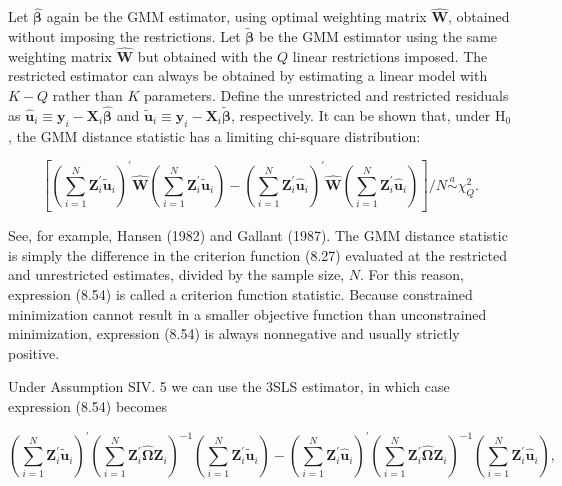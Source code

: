 \documentclass[10pt]{article}
\begin{document}
Let $\hat{\boldsymbol{\beta}}$ again be the GMM estimator, using optimal weighting matrix $\hat{\mathbf{W}}$, obtained without imposing the restrictions. Let $\tilde{\boldsymbol{\beta}}$ be the GMM estimator using the same weighting matrix $\hat{\mathbf{W}}$ but obtained with the $Q$ linear restrictions imposed. The restricted estimator can always be obtained by estimating a linear model with $K-Q$ rather than $K$ parameters. Define the unrestricted and restricted residuals as $\hat{\mathbf{u}}_{i} \equiv \mathbf{y}_{i}-\mathbf{X}_{i} \hat{\boldsymbol{\beta}}$ and $\tilde{\mathbf{u}}_{i} \equiv \mathbf{y}_{i}-\mathbf{X}_{i} \tilde{\boldsymbol{\beta}}$, respectively. It can be shown that, under $\mathrm{H}_{0}$, the GMM distance statistic has a limiting chi-square distribution:


\begin{equation*}
\left[\left(\sum_{i=1}^{N} \mathbf{Z}_{i}^{\prime} \tilde{\mathbf{u}}_{i}\right)^{\prime} \hat{\mathbf{W}}\left(\sum_{i=1}^{N} \mathbf{Z}_{i}^{\prime} \tilde{\mathbf{u}}_{i}\right)-\left(\sum_{i=1}^{N} \mathbf{Z}_{i}^{\prime} \hat{\mathbf{u}}_{i}\right)^{\prime} \hat{\mathbf{W}}\left(\sum_{i=1}^{N} \mathbf{Z}_{i}^{\prime} \hat{\mathbf{u}}_{i}\right)\right] / N \stackrel{a}{\sim} \chi_{Q}^{2} . \tag{8.54}
\end{equation*}


See, for example, Hansen (1982) and Gallant (1987). The GMM distance statistic is simply the difference in the criterion function (8.27) evaluated at the restricted and unrestricted estimates, divided by the sample size, $N$. For this reason, expression (8.54) is called a criterion function statistic. Because constrained minimization cannot result in a smaller objective function than unconstrained minimization, expression (8.54) is always nonnegative and usually strictly positive.

Under Assumption SIV. 5 we can use the 3SLS estimator, in which case expression (8.54) becomes


\begin{equation*}
\left(\sum_{i=1}^{N} \mathbf{Z}_{i}^{\prime} \tilde{\mathbf{u}}_{i}\right)^{\prime}\left(\sum_{i=1}^{N} \mathbf{Z}_{i}^{\prime} \hat{\boldsymbol{\Omega}} \mathbf{Z}_{i}\right)^{-1}\left(\sum_{i=1}^{N} \mathbf{Z}_{i}^{\prime} \tilde{\mathbf{u}}_{i}\right)-\left(\sum_{i=1}^{N} \mathbf{Z}_{i}^{\prime} \hat{\mathbf{u}}_{i}\right)^{\prime}\left(\sum_{i=1}^{N} \mathbf{Z}_{i}^{\prime} \hat{\boldsymbol{\Omega}} \mathbf{Z}_{i}\right)^{-1}\left(\sum_{i=1}^{N} \mathbf{Z}_{i}^{\prime} \hat{\mathbf{u}}_{i}\right), \tag{8.55}
\end{equation*}
\end{document}
